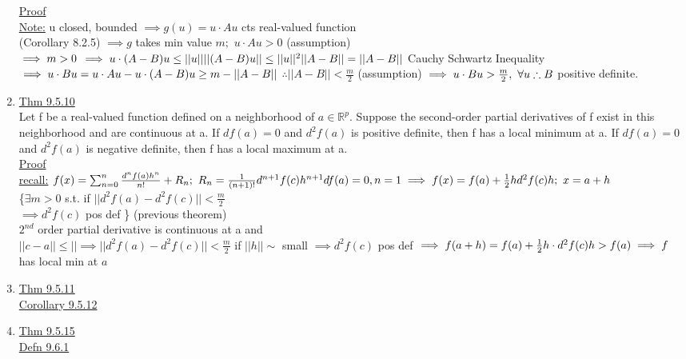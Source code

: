\documentclass[12pt]{amsart}
\begin{document}
\begin{enumerate}
\underline{Proof}\\
\underline{Note:} u closed, bounded $\implies g(u) = u \cdot A u$ cts real-valued function\\
(Corollary 8.2.5) $\implies g$ takes min value $m;\,\, u \cdot A u >0$ (assumption)\\
$\implies m>0\\$
$\implies u \cdot(A-B) u \leq ||u|| ||(A-B) u|| \leq ||u ||^2 ||A-B|| = ||A-B||\\$
Cauchy Schwartz Inequality\\
$\implies u \cdot B u = u \cdot A u - u \cdot (A-B) u \geq m- ||A-B||\\$
$\therefore ||A-B|| < \frac{m}{2}$ (assumption) $\implies u \cdot B u > \frac{m}{2},\,\, \forall u\\
\therefore B$ positive definite.


\hdashrule[0.5ex][c]{\linewidth}{0.5pt}{1.5mm}


\item \underline{Thm 9.5.10}\\
Let f be a real-valued function defined on a neighborhood of $a \in \mathbb{R}^p$. Suppose the second-order partial derivatives of f exist in this neighborhood and are continuous at a. If $df(a)=0$ and $d^2 f(a)$ is positive definite, then f has a local minimum at a. If $df(a)=0$ and $d^2 f(a)$ is negative definite, then f has a local maximum at a.\\
\underline{Proof}\\
\underline{recall:} $f(x)=\sum_{n=0}^n \frac{d^n f(a) h^n}{n!} + R_n;\,\, R_n= \frac{1}{(n+1)!} d^{n+1} f(c) h^{n+1}\\
df(a)=0, n=1\\
\implies f(x) = f(a) + \frac{1}{2} h d^2 f(c) h;\,\, x=a+h$\\
\{$\exists m>0$ s.t. if $||d^2f(a)-d^2 f(c)|| < \frac{m}{2}$\\
$\implies d^2 f(c)$ pos def \} (previous theorem)\\
$2^{nd}$ order partial derivative is continuous at a and \\
$||c-a|| \leq || \implies || d^2 f(a) - d^2 f(c) ||< \frac{m}{2}$ if $||h || \sim$ small
$\implies d^2f(c)$ pos def $\implies f(a+h)=f(a) + \frac{1}{2} h \cdot d^2 f(c) h> f(a)\\
\implies f$ has local min at $a$\\
\item \underline{Thm 9.5.11}\\
\underline{Corollary 9.5.12}\\
\item \underline{Thm 9.5.15}\\
\underline{Defn 9.6.1}\\



\end{enumerate}
\end{document}
